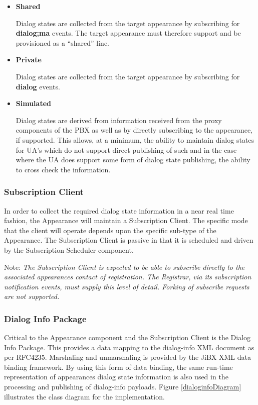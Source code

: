 \documentclass[twoside,11pt]{article}
\newcommand{\bold}[1]{\textbf{#1}}
\begin{document}
\begin{itemize}
  \item \bold{Shared}

  Dialog states are collected from the target appearance by subscribing for \bold{dialog;ma} events.
   The target appearance must therefore support and be provisioned as a ``shared'' line.

  \item \bold{Private}

  Dialog states are collected from the target appearance by subscribing for \bold{dialog} events.

  \item \bold{Simulated}

  Dialog states are derived from information received from the proxy components of the PBX as well
  as by directly subscribing to the appearance, if supported.  This allows, at a minimum, the
  ability to maintain dialog states for UA's which do not support direct publishing of such and in
  the case where the UA does support some form of dialog state publishing, the ability to cross
  check the information.
\end{itemize}

\subsubsection{Subscription Client}
In order to collect the required dialog state information in a near real time fashion, the
Appearance will maintain a Subscription Client.  The specific mode that the client will operate
depends upon the specific sub-type of the Appearance.  The Subscription Client is passive in that it
is scheduled and driven by the Subscription Scheduler component.

Note: \emph{The Subscription Client is expected to be able to subscribe directly to the associated
appearances contact of registration.  The Registrar, via its subscription notification events, must
supply this level of detail.  Forking of subscribe requests are not supported.}

\subsubsection{Dialog Info Package}
Critical to the Appearance component and the Subscription Client is the Dialog Info Package.  This
provides a data mapping to the dialog-info XML document as per RFC4235.  Marshaling and unmarshaling
is provided by the JiBX XML data binding framework.  By using this form of data binding, the same
run-time representation of appearances dialog state information is also used in the processing and
publishing of dialog-info payloads. Figure \ref{dialoginfoDiagram} illustrates
the class diagram for the implementation.
\end{document}
